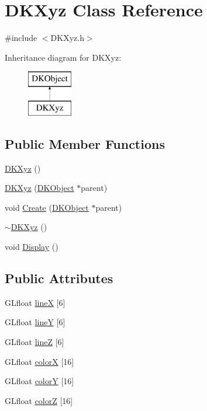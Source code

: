 \hypertarget{class_d_k_xyz}{\section{D\-K\-Xyz Class Reference}
\label{class_d_k_xyz}
}


{\ttfamily \#include $<$D\-K\-Xyz.\-h$>$}

Inheritance diagram for D\-K\-Xyz\-:\begin{figure}[H]
\begin{center}
\leavevmode
\includegraphics[height=2.000000cm]{class_d_k_xyz}
\end{center}
\end{figure}
\subsection*{Public Member Functions}
\begin{DoxyCompactItemize}
\item 
\hyperlink{class_d_k_xyz_a20d2ff261f4c2ecdf2f9134eef1285da}{D\-K\-Xyz} ()
\item 
\hyperlink{class_d_k_xyz_ac89636be7ca67de91bf1a90c89a283f6}{D\-K\-Xyz} (\hyperlink{class_d_k_object}{D\-K\-Object} $\ast$parent)
\item 
void \hyperlink{class_d_k_xyz_a0e6900acf0a698335fbcee7e9834554a}{Create} (\hyperlink{class_d_k_object}{D\-K\-Object} $\ast$parent)
\item 
\hyperlink{class_d_k_xyz_af7d4435d10be7ec6e44411f3a2d6de64}{$\sim$\-D\-K\-Xyz} ()
\item 
void \hyperlink{class_d_k_xyz_adf779758ef2c98d289cbd5525e99b29b}{Display} ()
\end{DoxyCompactItemize}
\subsection*{Public Attributes}
\begin{DoxyCompactItemize}
\item 
G\-Lfloat \hyperlink{class_d_k_xyz_ae26ade46ab059bccc0b398ce46f2a218}{line\-X} \mbox{[}6\mbox{]}
\item 
G\-Lfloat \hyperlink{class_d_k_xyz_a6150491e6a7cda2eafeefbd30133bda8}{line\-Y} \mbox{[}6\mbox{]}
\item 
G\-Lfloat \hyperlink{class_d_k_xyz_aabf893ac3435776b8a9283226a4a8881}{line\-Z} \mbox{[}6\mbox{]}
\item 
G\-Lfloat \hyperlink{class_d_k_xyz_af13cecd85d6408ee8c79cfef2ea8eb72}{color\-X} \mbox{[}16\mbox{]}
\item 
G\-Lfloat \hyperlink{class_d_k_xyz_a3542bba8788158a8446df80dde93782f}{color\-Y} \mbox{[}16\mbox{]}
\item 
G\-Lfloat \hyperlink{class_d_k_xyz_aec9854db6b80b43d01794bbdd66d0642}{color\-Z} \mbox{[}16\mbox{]}
\end{DoxyCompactItemize}
